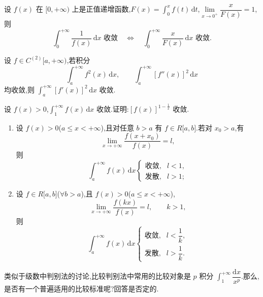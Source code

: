 \documentclass[../数学分析培优讲义.tex]{subfiles}
\begin{document}
\begin{example}
设 $f(x)$ 在 $\lbrack 0,+\infty)$ 上是正值递增函数,$\displaystyle F(x)=\int_0^xf(t)\,\mathrm{d}t$,$\displaystyle\lim\limits_{x\to0^+}\dfrac{x}{F(x)}=1$,则
\[
    \int_0^{+\infty}\dfrac{1}{f(x)}\,\mathrm{d}x\text{ 收敛}
    \quad\Longleftrightarrow\quad
    \int_0^{+\infty}\dfrac{x}{F(x)}\,\mathrm{d}x\text{ 收敛}.
\]
\end{example}
\exampleblank

\begin{example}
设 $f\in C^{(2)}\lbrack a,+\infty)$,若积分
\[
    \int_a^{+\infty}f^2(x)\,\mathrm{d}x,
    \qquad
    \int_a^{+\infty}[f''(x)]^2\,\mathrm{d}x
\]
均收敛,则 $\displaystyle\int_a^{+\infty}[f'(x)]^2\,\mathrm{d}x$ 收敛.
\end{example}
\exampleblank

\begin{example}
设 $f(x)>0$,$\displaystyle\int_1^{+\infty}f(x)\,\mathrm{d}x$ 收敛.证明:$[f(x)]^{1-\frac{1}{x}}$ 收敛.
\end{example}
\exampleblank

\begin{example}
\begin{enumerate}[label=(\arabic*)]
    \item 设 $f(x)>0$($a\leq x<+\infty$),且对任意 $b>a$ 有 $f\in R\lbrack a,b\rbrack$.若对 $x_0>a$,有
    \[
        \lim\limits_{x\to+\infty}\dfrac{f(x+x_0)}{f(x)}=l,
    \]
    则
    \[
        \int_a^{+\infty}f(x)\,\mathrm{d}x
        \begin{cases}
            \text{收敛},&l<1,\\
            \text{发散},&l>1;
        \end{cases}
    \]
    \item 设 $f\in R\lbrack a,b\rbrack$($\forall b>a$),且 $f(x)>0$($a\leq x<+\infty$),
    \[
        \lim\limits_{x\to+\infty}\dfrac{f(kx)}{f(x)}=l,
        \qquad k>1,
    \]
    则
    \[
        \int_a^{+\infty}f(x)\,\mathrm{d}x
        \begin{cases}
            \text{收敛},&l<\dfrac{1}{k},\\
            \text{发散},&l>\dfrac{1}{k}.
        \end{cases}
    \]
\end{enumerate}
\end{example}
\exampleblank

类似于级数中判别法的讨论,比较判别法中常用的比较对象是 $p$ 积分 $\displaystyle\int_1^{+\infty}\dfrac{\mathrm{d}x}{x^p}$.那么,是否有一个普遍适用的比较标准呢?回答是否定的.
\end{document}
